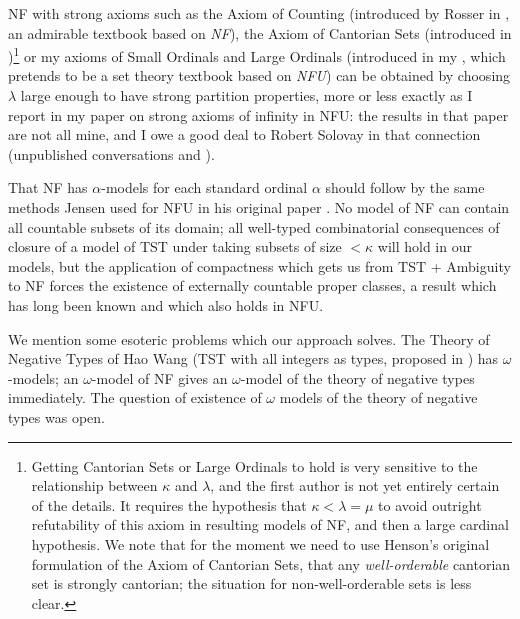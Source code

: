 \documentclass[112pt]{article}
\begin{document}
NF with strong axioms such as the Axiom of Counting (introduced by Rosser in \cite{rosser}, an admirable textbook based on {\em NF\/}), the Axiom of Cantorian Sets (introduced in \cite{henson})\footnote{Getting Cantorian Sets or Large Ordinals to hold is very sensitive to the relationship between $\kappa$ and $\lambda$, and the first author is not yet entirely certain of the details.  It requires the hypothesis that $\kappa<\lambda=\mu$ to avoid outright refutability of this axiom in resulting models of NF, and then a large cardinal hypothesis.  We note that for the moment we need to use Henson's original formulation of the Axiom of Cantorian Sets, that any {\em well-orderable\/} cantorian set is strongly cantorian;  the situation for non-well-orderable sets is less clear.} or my axioms of Small Ordinals and Large Ordinals (introduced in  my \cite{mybook}, which pretends to be a set theory textbook based on {\em NFU\/}) can be obtained by choosing $\lambda$ large enough to have strong partition properties, more or less exactly as I report in my paper \cite{strongaxioms} on strong axioms of infinity in NFU:  the results in that paper are not all mine, and I owe a good deal to Robert Solovay in that connection (unpublished conversations and \cite{nfub}).

That NF has $\alpha$-models for each standard ordinal $\alpha$ should follow by the same methods Jensen used for NFU in his original paper \cite{nfu}.   No model of NF can contain all countable subsets of its domain;  all well-typed combinatorial consequences
of closure of a model of TST under taking subsets of size $<\kappa$ will hold in our models, but the application of compactness which gets us from TST + Ambiguity to NF forces the existence of externally countable proper classes, a result which has long been known and which also holds in NFU.

We mention some esoteric problems which our approach solves.  The Theory of Negative Types of Hao Wang (TST with all integers as types, proposed in \cite{tnt})  has $\omega$-models;  an $\omega$-model of NF gives an $\omega$-model of the theory of negative types  immediately.  The question of existence of $\omega$ models of the theory of negative types was open.
\end{document}
